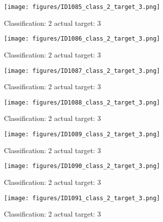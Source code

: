 \begin{figure}[h!]
\begin{center}
\texttt{[image: figures/ID1085\_class\_2\_target\_3.png]}
\end{center}
\caption{ Classification: 2 actual target: 3}
\label{fig:ID1085_class_2_target_3}
\end{figure}
\begin{figure}[h!]
\begin{center}
\texttt{[image: figures/ID1086\_class\_2\_target\_3.png]}
\end{center}
\caption{ Classification: 2 actual target: 3}
\label{fig:ID1086_class_2_target_3}
\end{figure}
\begin{figure}[h!]
\begin{center}
\texttt{[image: figures/ID1087\_class\_2\_target\_3.png]}
\end{center}
\caption{ Classification: 2 actual target: 3}
\label{fig:ID1087_class_2_target_3}
\end{figure}
\begin{figure}[h!]
\begin{center}
\texttt{[image: figures/ID1088\_class\_2\_target\_3.png]}
\end{center}
\caption{ Classification: 2 actual target: 3}
\label{fig:ID1088_class_2_target_3}
\end{figure}
\begin{figure}[h!]
\begin{center}
\texttt{[image: figures/ID1089\_class\_2\_target\_3.png]}
\end{center}
\caption{ Classification: 2 actual target: 3}
\label{fig:ID1089_class_2_target_3}
\end{figure}
\begin{figure}[h!]
\begin{center}
\texttt{[image: figures/ID1090\_class\_2\_target\_3.png]}
\end{center}
\caption{ Classification: 2 actual target: 3}
\label{fig:ID1090_class_2_target_3}
\end{figure}
\begin{figure}[h!]
\begin{center}
\texttt{[image: figures/ID1091\_class\_2\_target\_3.png]}
\end{center}
\caption{ Classification: 2 actual target: 3}
\label{fig:ID1091_class_2_target_3}
\end{figure}
